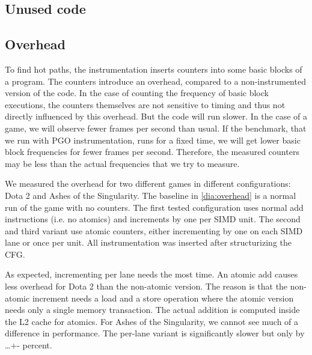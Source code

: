 \subsection{Unused code}
\label{sub:evaluation_unused}

\subsection{Overhead}
\label{sub:overhead}
To find hot paths, the instrumentation inserts counters into some basic blocks of a program. The counters introduce an overhead, compared to a non-instrumented version of the code.
In the case of counting the frequency of basic block executions, the counters themselves are not sensitive to timing and thus not directly influenced by this overhead.
But the code will run slower. In the case of a game, we will observe fewer frames per second than usual.
If the benchmark, that we run with PGO instrumentation, runs for a fixed time, we will get lower basic block frequencies for fewer frames per second.
Therefore, the measured counters may be less than the actual frequencies that we try to measure.

We measured the overhead for two different games in different configurations: Dota 2 and Ashes of the Singularity. The baseline in \cref{dia:overhead} is a normal run of the game with no counters.
The first tested configuration uses normal add instructions (i.e. no atomics) and increments by one per SIMD unit.
The second and third variant use atomic counters, either incrementing by one on each SIMD lane or once per unit.
All instrumentation was inserted after structurizing the CFG.

As expected, incrementing per lane needs the most time. An atomic add causes less overhead for Dota 2 than the non-atomic version.
The reason is that the non-atomic increment needs a load and a store operation where the atomic version needs only a single memory transaction. The actual addition is computed inside the L2 cache for atomics.
For Ashes of the Singularity, we cannot see much of a difference in performance. The per-lane variant is significantly slower but only by \dots +- percent.

